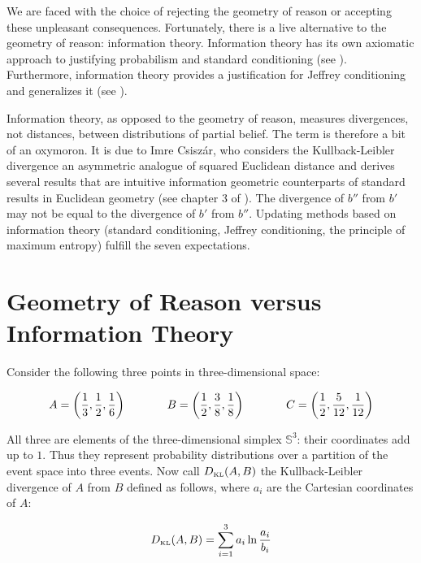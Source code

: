 \documentclass[11pt]{article} \usepackage{october} \onehalfspacing
\begin{document}
We are faced with the choice of rejecting the geometry of reason or
accepting these unpleasant consequences. Fortunately, there is a live
alternative to the geometry of reason: information theory. Information
theory has its own axiomatic approach to justifying probabilism and
standard conditioning (see ). Furthermore,
information theory provides a justification for Jeffrey conditioning
and generalizes it (see ).

Information theory, as opposed to the geometry of reason, measures
divergences, not distances, between distributions of partial belief.
The term  is therefore a bit of an
oxymoron. It is due to Imre Csisz{\'a}r, who considers the
Kullback-Leibler divergence an asymmetric analogue of squared
Euclidean distance and derives several results that are intuitive
information geometric counterparts of standard results in Euclidean
geometry (see chapter 3 of ). The
divergence of $b''$ from $b'$ may not be equal to the divergence of
$b'$ from $b''$. Updating methods based on information theory
(standard conditioning, Jeffrey conditioning, the principle of maximum
entropy) fulfill the seven expectations.

\section{Geometry of Reason versus Information Theory}
\label{grit}

Consider the following three points in three-dimensional space:

\begin{equation}
  \label{eq:e6}
  A=\left(\frac{1}{3},\frac{1}{2},\frac{1}{6}\right) \hspace{.5in}
  B=\left(\frac{1}{2},\frac{3}{8},\frac{1}{8}\right)  \hspace{.5in}
  C=\left(\frac{1}{2},\frac{5}{12},\frac{1}{12}\right)
\end{equation}

All three are elements of the three-dimensional simplex
$\mathbb{S}^{3}$: their coordinates add up to $1$. Thus they represent
probability distributions over a partition of the event space into
three events. Now call $D_{\mbox{\tiny KL}}(A,B)$ the Kullback-Leibler
divergence of $A$ from $B$ defined as follows, where $a_{i}$ are the
Cartesian coordinates of $A$:

\begin{equation}
  \label{eq:e7}
  D_{\mbox{\tiny KL}}(A,B)=\sum_{i=1}^{3}a_{i}\ln\frac{a_{i}}{b_{i}}
\end{equation}
\end{document}
